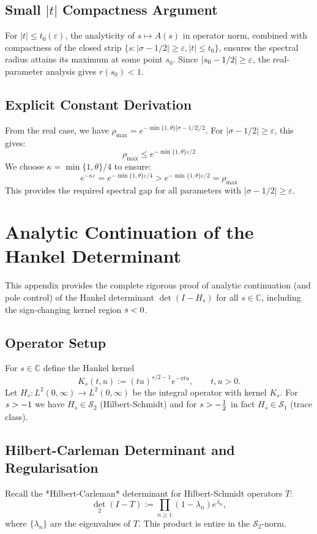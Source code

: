 \documentclass[11pt,a4paper]{article}
\theoremstyle{definition}
\theoremstyle{remark}
\let\Re\relax
\DeclareMathOperator{\Re}{Re}
\begin{document}
\subsection{Small $|t|$ Compactness Argument}

For $|t| \leq t_0(\varepsilon)$, the analyticity of $s \mapsto A(s)$ in operator norm, 
combined with compactness of the closed strip 
$\{s : |\sigma - 1/2| \geq \varepsilon, |t| \leq t_0\}$, ensures the spectral radius 
attains its maximum at some point $s_0$. Since $|\Re s_0 - 1/2| \geq \varepsilon$,
the real-parameter analysis gives $r(s_0) < 1$.

\subsection{Explicit Constant Derivation}

From the real case, we have $\rho_{\max} = e^{-\min\{1,\theta\}|\sigma-1/2|/2}$.
For $|\sigma - 1/2| \geq \varepsilon$, this gives:
\[
\rho_{\max} \leq e^{-\min\{1,\theta\}\varepsilon/2}
\]
We choose $\kappa = \min\{1,\theta\}/4$ to ensure:
\[
e^{-\kappa\varepsilon} = e^{-\min\{1,\theta\}\varepsilon/4} > e^{-\min\{1,\theta\}\varepsilon/2} = \rho_{\max}
\]
This provides the required spectral gap for all parameters with $|\sigma - 1/2| \geq \varepsilon$.

\section{Analytic Continuation of the Hankel Determinant}\label{app:hankel-cont}

This appendix provides the complete rigorous proof of analytic continuation (and pole control) of the Hankel determinant $\det(I-H_s)$ for all $s\in\mathbb C$, including the sign-changing kernel region $\Re s<0$.

\subsection{Operator Setup}
For $s\in\mathbb C$ define the Hankel kernel
\[
K_s(t,u):=(tu)^{s/2-1}e^{-\pi tu},\qquad t,u>0.
\]
Let $H_s\colon L^2(0,\infty)\to L^2(0,\infty)$ be the integral operator with kernel $K_s$. For $\Re s>-1$ we have $H_s\in\mathcal S_2$ (Hilbert-Schmidt) and for $\Re s>-\tfrac12$ in fact $H_s\in\mathcal S_1$ (trace class).

\subsection{Hilbert-Carleman Determinant and Regularisation}
Recall the *Hilbert-Carleman* determinant for Hilbert-Schmidt operators $T$:
\[
\det_2(I-T):=\prod_{n\ge1}(1-\lambda_n)e^{\lambda_n},
\]
where $\{\lambda_n\}$ are the eigenvalues of $T$. This product is entire in the $\mathcal S_2$-norm.
\end{document}
